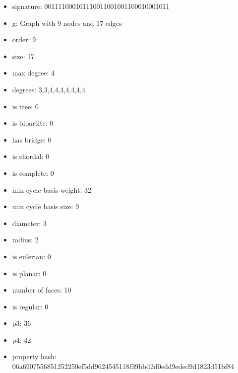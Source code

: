 \newpage
\begin{figure}
\end{figure}
\begin{itemize}
\item signature: 001111000101110011001001100010001011
\item g: Graph with 9 nodes and 17 edges
\item order: 9
\item size: 17
\item max degree: 4
\item degrees: 3,3,4,4,4,4,4,4,4
\item is tree: 0
\item is bipartite: 0
\item has bridge: 0
\item is chordal: 0
\item is complete: 0
\item min cycle basis weight: 32
\item min cycle basis size: 9
\item diameter: 3
\item radius: 2
\item is eulerian: 0
\item is planar: 0
\item number of faces: 10
\item is regular: 0
\item p3: 36
\item p4: 42
\item property hash: 06a6907556851252250ef5dd9624545118f39bbd2d0edd9eded9d1823d51bf84
\end{itemize}

